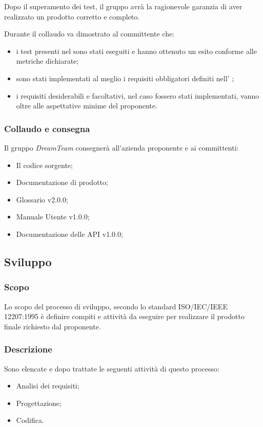 Dopo il superamento  dei test, il gruppo avrà la ragionevole garanzia di aver realizzato un prodotto corretto e completo.

Durante il collaudo va dimostrato al committente che:
\begin{itemize}
\item i test presenti nel \PdQ sono stati eseguiti e hanno ottenuto un esito conforme alle metriche dichiarate;
\item sono stati implementati al meglio i requisiti obbligatori definiti nell' \AdR ;
\item i requisiti desiderabili e facoltativi, nel caso fossero stati implementati, vanno oltre
alle aspettative minime del proponente.
\end{itemize}

\subsubsection{Collaudo e consegna}

Il gruppo \textit{DreamTeam} consegnerà all’azienda proponente e ai committenti:
\begin{itemize}
\item Il codice sorgente;
\item Documentazione di prodotto;
\item Glossario v2.0.0;
\item Manuale Utente v1.0.0;
\item Documentazione delle API v1.0.0;
\end{itemize}
\subsection{Sviluppo}

\subsubsection{Scopo}
Lo scopo del processo di sviluppo, secondo lo standard  ISO/IEC/IEEE 12207:1995 è definire compiti e attività da eseguire per realizzare il prodotto finale richiesto dal proponente.

\subsubsection{Descrizione}
Sono elencate e dopo trattate le seguenti attività di questo processo:
\begin{itemize}
  \item Analisi dei requisiti;
  \item Progettazione;
  \item Codifica.
\end{itemize}

